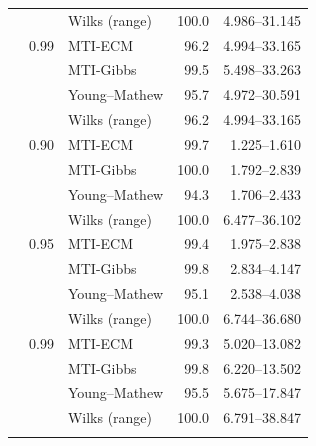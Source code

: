 \begin{longtable}{@{}rrlrr@{}}
 &  & Wilks (range) & 100.0 & 4.986--31.145 \\
\addlinespace[0.3em]
500 & 0.99 & MTI-ECM & 96.2 & 4.994--33.165 \\
 &  & MTI-Gibbs & 99.5 & 5.498--33.263 \\
 &  & Young--Mathew & 95.7 & 4.972--30.591 \\
 &  & Wilks (range) & 96.2 & 4.994--33.165 \\
\addlinespace[0.3em]
1000 & 0.90 & MTI-ECM & 99.7 & 1.225--1.610 \\
 &  & MTI-Gibbs & 100.0 & 1.792--2.839 \\
 &  & Young--Mathew & 94.3 & 1.706--2.433 \\
 &  & Wilks (range) & 100.0 & 6.477--36.102 \\
\addlinespace[0.3em]
1000 & 0.95 & MTI-ECM & 99.4 & 1.975--2.838 \\
 &  & MTI-Gibbs & 99.8 & 2.834--4.147 \\
 &  & Young--Mathew & 95.1 & 2.538--4.038 \\
 &  & Wilks (range) & 100.0 & 6.744--36.680 \\
\addlinespace[0.3em]
1000 & 0.99 & MTI-ECM & 99.3 & 5.020--13.082 \\
 &  & MTI-Gibbs & 99.8 & 6.220--13.502 \\
 &  & Young--Mathew & 95.5 & 5.675--17.847 \\
 &  & Wilks (range) & 100.0 & 6.791--38.847 \\
\addlinespace[0.3em]
\end{longtable}
\clearpage
